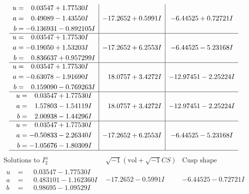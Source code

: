 \documentclass[1p]{elsarticle_modified}
\theoremstyle{definition}
\newcommand{\I}{\sqrt{-1}}
\begin{document}
$$\begin{array}{c|c|c}
\begin{aligned}
u &= \phantom{-}0.03547 + 1.77530 I \\
a &= \phantom{-}0.49089 - 1.43550 I \\
b &= -0.136931 - 0.892105 I\end{aligned}
 & -17.2652 + 0.5991 I & -6.44525 + 0.72721 I \\ \hline\begin{aligned}
u &= \phantom{-}0.03547 + 1.77530 I \\
a &= -0.19050 + 1.53203 I \\
b &= \phantom{-}0.836637 + 0.957299 I\end{aligned}
 & -17.2652 + 6.2553 I & -6.44525 - 5.23168 I \\ \hline\begin{aligned}
u &= \phantom{-}0.03547 + 1.77530 I \\
a &= -0.63078 - 1.91690 I \\
b &= \phantom{-}0.159090 - 0.769263 I\end{aligned}
 & \phantom{-}18.0757 + 3.4272 I & -12.97451 - 2.25224 I \\ \hline\begin{aligned}
u &= \phantom{-}0.03547 + 1.77530 I \\
a &= \phantom{-}1.57803 - 1.54119 I \\
b &= \phantom{-}2.00938 - 1.44296 I\end{aligned}
 & \phantom{-}18.0757 + 3.4272 I & -12.97451 - 2.25224 I \\ \hline\begin{aligned}
u &= \phantom{-}0.03547 + 1.77530 I \\
a &= -0.50833 - 2.26340 I \\
b &= -1.05676 - 1.80309 I\end{aligned}
 & -17.2652 + 6.2553 I & -6.44525 - 5.23168 I\\
 \hline 
 \end{array}$$\newpage$$\begin{array}{c|c|c}  
\text{Solutions to }I^u_{2}& \I (\text{vol} + \sqrt{-1}CS) & \text{Cusp shape}\\
 \hline 
\begin{aligned}
u &= \phantom{-}0.03547 - 1.77530 I \\
a &= \phantom{-}0.483101 - 1.162360 I \\
b &= \phantom{-}0.98695 - 1.09529 I\end{aligned}
 & -17.2652 - 0.5991 I & -6.44525 - 0.72721 I \\ \hline\begin{aligned}

\end{aligned}
\end{array}$$
\end{document}
